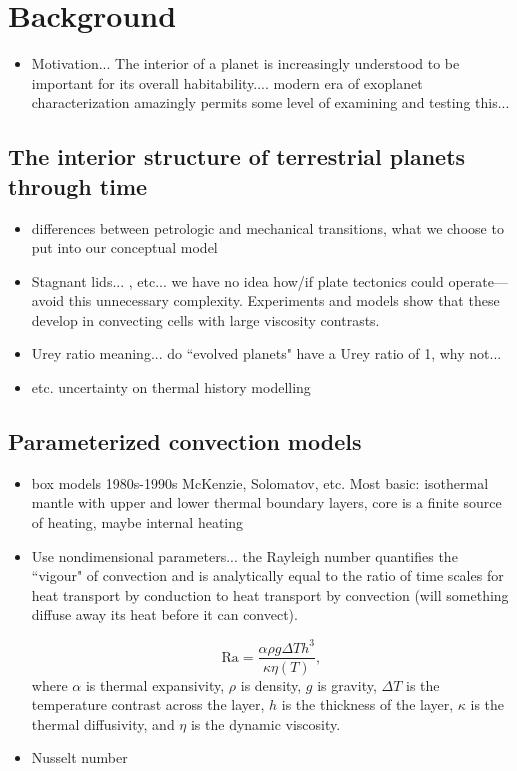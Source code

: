 \section{Background}

\begin{itemize}
\item Motivation... The interior of a planet is increasingly understood to be important for its overall habitability.... modern era of exoplanet characterization amazingly permits some level of examining and testing this...
\end{itemize}

\subsection{The interior structure of terrestrial planets through time}
\begin{itemize}
\item differences between petrologic and mechanical transitions, what we choose to put into our conceptual model
\item Stagnant lids... \citet{Davaille1993, Reese2005, ORourke2012}, etc... we have no idea how/if plate tectonics could operate---avoid this unnecessary complexity. Experiments and models show that these develop in convecting cells with large viscosity contrasts.
\item Urey ratio meaning... do ``evolved planets" have a Urey ratio of 1, why not...
\item \citep{Seales2019, Seales2019a} etc. uncertainty on thermal history modelling 
\end{itemize}

\subsection{Parameterized convection models}

\begin{itemize}
\item box models 1980s-1990s McKenzie, Solomatov, etc. Most basic: isothermal mantle with upper and lower thermal boundary layers, core is a finite source of heating, maybe internal heating
\item Use nondimensional parameters... the Rayleigh number quantifies the ``vigour" of convection and is analytically equal to the ratio of time scales for heat transport by conduction to heat transport by convection (will something diffuse away its heat before it can convect). 


\begin{equation}\label{eq:Ra}
\mathrm{Ra} = \frac{\alpha \rho g \Delta T h^3 }{ \kappa \eta(T)},
\end{equation}
where $\alpha$ is thermal expansivity, $\rho$ is density, $g$ is gravity, $\Delta T$ is the temperature contrast across the layer, $h$ is the thickness of the layer, $\kappa$ is the thermal diffusivity, and $\eta$ is the dynamic viscosity.

\item Nusselt number
\end{itemize}


